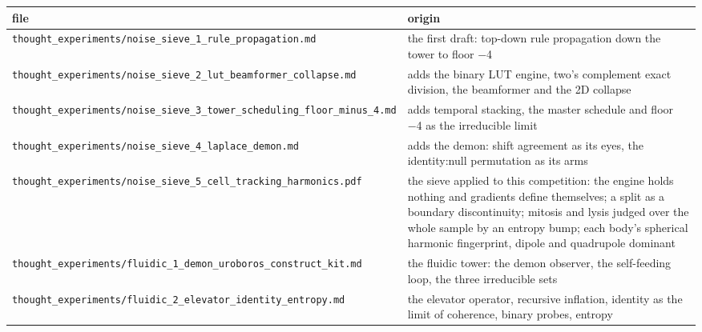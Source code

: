 {\small
\setlength{\tabcolsep}{6pt}
\begin{longtable}{>{\RaggedRight\arraybackslash}p{}>{\RaggedRight\arraybackslash}p{}}
\toprule
file & origin \\
\midrule
\endhead
\texttt{thought\_\allowbreak{}experiments/\allowbreak{}noise\_\allowbreak{}sieve\_\allowbreak{}1\_\allowbreak{}rule\_\allowbreak{}propagation.\allowbreak{}md} & the first draft: top-down rule propagation down the tower to floor −4 \\
\texttt{thought\_\allowbreak{}experiments/\allowbreak{}noise\_\allowbreak{}sieve\_\allowbreak{}2\_\allowbreak{}lut\_\allowbreak{}beamformer\_\allowbreak{}collapse.\allowbreak{}md} & adds the binary LUT engine, two's complement exact division, the beamformer and the 2D collapse \\
\texttt{thought\_\allowbreak{}experiments/\allowbreak{}noise\_\allowbreak{}sieve\_\allowbreak{}3\_\allowbreak{}tower\_\allowbreak{}scheduling\_\allowbreak{}floor\_\allowbreak{}minus\_\allowbreak{}4.\allowbreak{}md} & adds temporal stacking, the master schedule and floor −4 as the irreducible limit \\
\texttt{thought\_\allowbreak{}experiments/\allowbreak{}noise\_\allowbreak{}sieve\_\allowbreak{}4\_\allowbreak{}laplace\_\allowbreak{}demon.\allowbreak{}md} & adds the demon: shift agreement as its eyes, the identity:null permutation as its arms \\
\texttt{thought\_\allowbreak{}experiments/\allowbreak{}noise\_\allowbreak{}sieve\_\allowbreak{}5\_\allowbreak{}cell\_\allowbreak{}tracking\_\allowbreak{}harmonics.\allowbreak{}pdf} & the sieve applied to this competition: the engine holds nothing and gradients define themselves; a split as a boundary discontinuity; mitosis and lysis judged over the whole sample by an entropy bump; each body's spherical harmonic fingerprint, dipole and quadrupole dominant \\
\texttt{thought\_\allowbreak{}experiments/\allowbreak{}fluidic\_\allowbreak{}1\_\allowbreak{}demon\_\allowbreak{}uroboros\_\allowbreak{}construct\_\allowbreak{}kit.\allowbreak{}md} & the fluidic tower: the demon observer, the self-feeding loop, the three irreducible sets \\
\texttt{thought\_\allowbreak{}experiments/\allowbreak{}fluidic\_\allowbreak{}2\_\allowbreak{}elevator\_\allowbreak{}identity\_\allowbreak{}entropy.\allowbreak{}md} & the elevator operator, recursive inflation, identity as the limit of coherence, binary probes, entropy \\

\end{longtable}}
